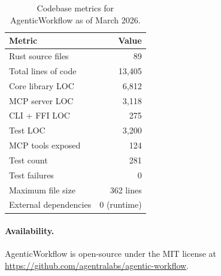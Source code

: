\documentclass[10pt, twocolumn]{article}
\begin{document}
\begin{table}[t]
\caption{Codebase metrics for AgenticWorkflow as of March 2026.}
\label{tab:metrics}
\centering\scriptsize
\begin{tabular}{@{}lr@{}}
\toprule
\textbf{Metric} & \textbf{Value} \\
\midrule
Rust source files      & 89 \\
Total lines of code    & 13{,}405 \\
Core library LOC       & 6{,}812 \\
MCP server LOC         & 3{,}118 \\
CLI + FFI LOC          & 275 \\
Test LOC               & 3{,}200 \\
MCP tools exposed      & 124 \\
Test count             & 281 \\
Test failures          & 0 \\
Maximum file size      & 362 lines \\
External dependencies  & 0 (runtime) \\
\bottomrule
\end{tabular}
\end{table}

\paragraph{Availability.} AgenticWorkflow is open-source under the MIT license at \url{https://github.com/agentralabs/agentic-workflow}.



\end{document}
